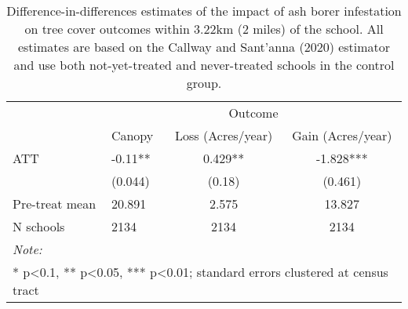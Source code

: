 \begin{table}[!h]

\caption{\label{tab:school-tree-table}Difference-in-differences estimates of the impact of ash borer infestation on tree cover outcomes within 3.22km (2 miles) of the school. All estimates are based on the Callway and Sant'anna (2020) estimator and use both not-yet-treated and never-treated schools in the control group.}
\centering
\begin{tabular}[t]{llcc}
\toprule
\multicolumn{1}{c}{ } & \multicolumn{3}{c}{Outcome} \\
\cmidrule(l{3pt}r{3pt}){2-4}
  & Canopy & Loss (Acres/year) & Gain (Acres/year)\\
\midrule
ATT & -0.11** & 0.429** & -1.828***\\
 & (0.044) & (0.18) & (0.461)\\
\midrule
Pre-treat mean & 20.891 & 2.575 & 13.827\\
N schools & 2134 & 2134 & 2134\\
\bottomrule
\multicolumn{4}{l}{\rule{0pt}{1em}\textit{Note: }}\\
\multicolumn{4}{l}{\rule{0pt}{1em}* p<0.1, ** p<0.05, *** p<0.01; standard errors clustered at census tract}\\
\end{tabular}
\end{table}
